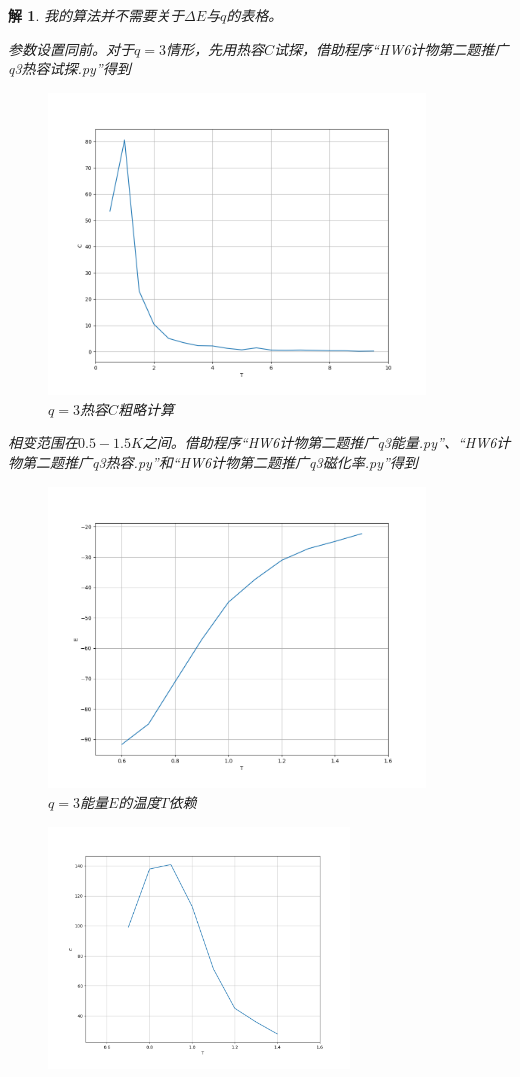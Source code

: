 \documentclass[10pt]{ctexart}
\newtheorem*{solution}{解}
\begin{document}
\begin{solution}
    我的算法并不需要关于$\Delta E$与$q$的表格。

    参数设置同前。对于$q=3$情形，先用热容$C$试探，借助程序“HW6计物第二题推广q3热容试探.py”得到
    \begin{figure}[H]
        \centering
        \includegraphics[width=10cm]{q3_rough.png}
        \caption{$q=3$热容$C$粗略计算}
    \end{figure}
    相变范围在$0.5-1.5K$之间。借助程序“HW6计物第二题推广q3能量.py”、“HW6计物第二题推广q3热容.py”和“HW6计物第二题推广q3磁化率.py”得到
    \begin{figure}[H]
        \centering
        \includegraphics[width=10cm]{q3_E.png}
        \caption{$q=3$能量$E$的温度$T$依赖}
    \end{figure}
    \begin{figure}[H]
        \centering
        \begin{minipage}{0.45\linewidth}
            \centering
            \includegraphics[width=8cm]{q3_C.png}

\end{minipage}
\end{figure}
\end{solution}
\end{document}
